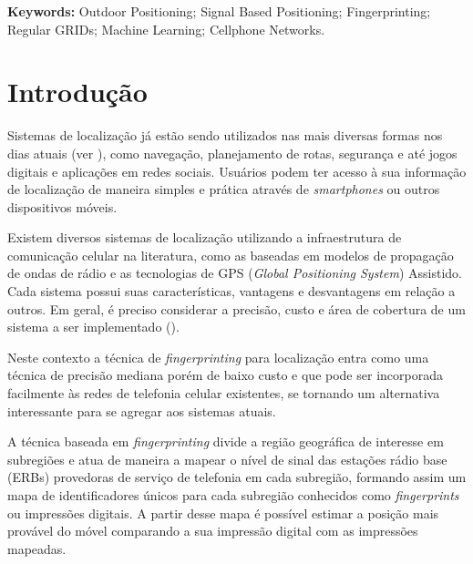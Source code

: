 \documentclass[12pt]{article}
\begin{document}
    \vspace{10pt}
    
    \begin{sloppypar}
    \par{\textbf{Keywords:} Outdoor Positioning; Signal Based Positioning; Fingerprinting; Regular GRIDs; Machine Learning;  Cellphone Networks.}
    \end{sloppypar}
    
    \newpage
    \listoffigures
    
    \newpage
    \listoftables

    \newpage
    \thispagestyle{empty}
    \tableofcontents

    \newpage
    \section{Introdução}
    \label{sec:introducao}
        
    Sistemas de localização já estão sendo utilizados nas mais diversas formas nos dias atuais (ver \cite{taxonomyLocationServices2003}), como navegação, planejamento de rotas, segurança e até jogos digitais e aplicações em redes sociais. Usuários podem ter acesso à sua informação de localização de maneira simples e prática através de \textit{smartphones} ou outros dispositivos móveis.
        
    Existem diversos sistemas de localização utilizando a infraestrutura de comunicação celular na literatura, como as baseadas em modelos de propagação de ondas de rádio e as tecnologias de GPS (\textit{Global Positioning System}) Assistido. Cada sistema possui suas características, vantagens e desvantagens em relação a outros. Em geral, é preciso considerar a precisão, custo e área de cobertura de um sistema a ser implementado (\cite{locationSystems2008}).
        
    Neste contexto a técnica de \textit{fingerprinting} para localização entra como uma técnica de precisão mediana porém de baixo custo e que pode ser incorporada facilmente às redes de telefonia celular existentes, se tornando um alternativa interessante para se agregar aos sistemas atuais.
        
    A técnica baseada em \textit{fingerprinting} divide a região geográfica de interesse em subregiões e atua de maneira a mapear o nível de sinal das estações rádio base (ERBs) provedoras de serviço de telefonia em cada subregião, formando assim um mapa de identificadores únicos para cada subregião conhecidos como \textit{fingerprints} ou impressões digitais. A partir desse mapa é possível estimar a posição mais provável do móvel comparando a sua impressão digital com as impressões mapeadas.
        
\end{document}
